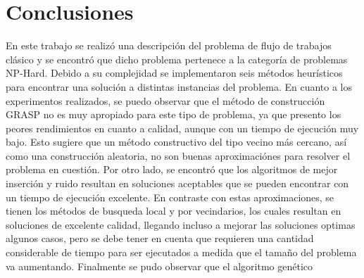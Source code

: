 \documentclass[10pt, twoside]{article}
\begin{document}
\section{Conclusiones}

En este trabajo se realizó una descripción del problema de flujo de trabajos
clásico y se encontró que dicho problema pertenece a la categoría de problemas
NP-Hard. Debido a su complejidad se implementaron seis métodos heurísticos
para encontrar una solución a distintas instancias del problema. En cuanto a
los experimentos realizados, se puedo observar que el método de construcción
GRASP no es muy apropiado para este tipo de problema, ya que presento los
peores rendimientos en cuanto a calidad, aunque con un tiempo de ejecución muy
bajo.  Esto sugiere que un método constructivo del tipo vecino más cercano, así
como una construcción aleatoria, no son buenas aproximaciónes para resolver el
problema en cuestión.  Por otro lado, se encontró que los algoritmos de mejor
inserción y ruido resultan en soluciones aceptables que se pueden encontrar con
un tiempo de ejecución excelente. En contraste con estas aproximaciones, se
tienen los métodos de busqueda local y por vecindarios, los cuales resultan en
soluciones de excelente calidad, llegando incluso a mejorar las soluciones optimas
algunos casos, pero se debe tener en cuenta que requieren una cantidad
considerable de tiempo para ser ejecutados a medida que el tamaño del problema
va aumentando. Finalmente se pudo observar que el algoritmo genético

{\small


}
\end{document}
